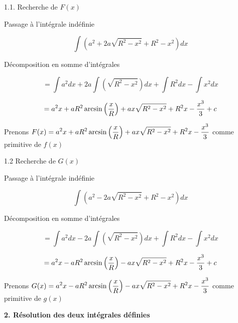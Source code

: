 \documentclass[10pt]{article}
\begin{document}
1.1. Recherche de $F(x)$ \vspace{0.5cm}

\hspace{0.8cm} Passage à l'intégrale indéfinie\vspace{0.2cm}

$$\int \left(a^2+2a\sqrt{R^2-x^2}+R^2-x^2\right)dx$$\vspace{0.01cm}

\hspace{0.8cm} Décomposition en somme d'intégrales\vspace{0.2cm}

$$=\int a^2dx + 2a\int\left(\sqrt{R^2-x^2}\right)dx + \int R^2dx - \int x^2dx$$

$$=a^2x + aR^2\arcsin\left({x\over{R}}\right) + ax\sqrt{R^2-x^2} + R^2x - {x^3\over{3}} + c$$

\begin{center}
\hspace{0.8cm} Prenons $\displaystyle{F(x)=a^2x + aR^2\arcsin\left({x\over{R}}\right) + ax\sqrt{R^2-x^2} + R^2x - {x^3\over{3}}}$ comme primitive de $f(x)$\vspace{0.2cm}
\end{center}

1.2 Recherche de $G(x)$ \vspace{0.5cm}

\hspace{0.8cm} Passage à l'intégrale indéfinie\vspace{0.2cm}

$$\int \left(a^2-2a\sqrt{R^2-x^2}+R^2-x^2\right)dx$$\vspace{0.01cm}

\hspace{0.8cm} Décomposition en somme d'intégrales\vspace{0.2cm}

$$=\int a^2dx - 2a\int\left(\sqrt{R^2-x^2}\right)dx + \int R^2dx - \int x^2dx$$

$$=a^2x - aR^2\arcsin\left({x\over{R}}\right) - ax\sqrt{R^2-x^2} + R^2x - {x^3\over{3}} + c$$

\begin{center}
\hspace{0.8cm} Prenons $\displaystyle{G(x)=a^2x - aR^2\arcsin\left({x\over{R}}\right) - ax\sqrt{R^2-x^2} + R^2x - {x^3\over{3}}}$ comme primitive de $g(x)$\vspace{0.2cm}
\end{center}

\textbf{2. Résolution des deux intégrales définies}\vspace{0.5cm}
\end{document}
